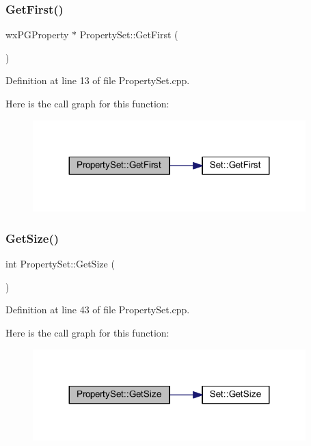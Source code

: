 \subsubsection{\texorpdfstring{Get\+First()}{GetFirst()}}
{\footnotesize\ttfamily wx\+P\+G\+Property $\ast$ Property\+Set\+::\+Get\+First (\begin{DoxyParamCaption}{ }\end{DoxyParamCaption})}



Definition at line 13 of file Property\+Set.\+cpp.

Here is the call graph for this function\+:
\nopagebreak
\begin{figure}[H]
\begin{center}
\leavevmode
\includegraphics[width=299pt]{class_property_set_aece224749884f449d1afda598d468b41_cgraph}
\end{center}
\end{figure}
\mbox{\label{class_property_set_abbc61ecb91ccb481ea4597e7d4c4be9b}} 
\subsubsection{\texorpdfstring{Get\+Size()}{GetSize()}}
{\footnotesize\ttfamily int Property\+Set\+::\+Get\+Size (\begin{DoxyParamCaption}{ }\end{DoxyParamCaption})}



Definition at line 43 of file Property\+Set.\+cpp.

Here is the call graph for this function\+:
\nopagebreak
\begin{figure}[H]
\begin{center}
\leavevmode
\includegraphics[width=299pt]{class_property_set_abbc61ecb91ccb481ea4597e7d4c4be9b_cgraph}
\end{center}
\end{figure}
\mbox{\label{class_property_set_affec0e3a12cfab591a5ea8821244aa60}} 
